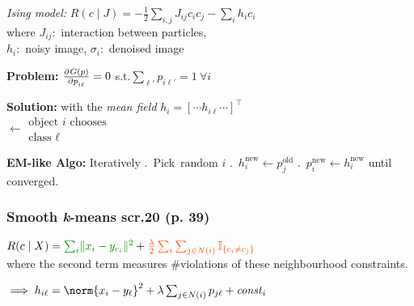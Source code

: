 \emph{Ising model:}\enskip
$R(c\mid J) = -\frac12 \sum_{i,j} J_{ij} c_i c_j - \sum_i h_i c_i$
\\
where $J_{ij}$:\, interaction between particles,\\\phantom{where}
$h_i$:\, noisy image,\enskip
$\sigma_i$:\, denoised image

\textbf{Problem:} \quad $\pderiv{G(p)}{p_{i\ell}} = 0$ \enspace s.t.\enspace $\sum_{\ell'} p_{i\ell'} = 1 \: \forall i$

\textbf{Solution:}\quad
with the \textit{mean field} $h_i = [\cdots h_{i\ell} \cdots]^\top$
\\
 $\leftarrow \substack{\text{object }i\text{ chooses}\\\text{class } \ell}$
\\

\textbf{EM-like Algo:}\enspace
Iteratively .~Pick~random $i$ .~$h_i^{\mathrm{new}} {\leftarrow} p_j^{\mathrm{old}}$ .~$p_i^{\mathrm{new}} {\leftarrow} h_i^{\mathrm{new}}$ \enspace
until converged.

\subsubsection{Smooth \textit{\rmfamily k}-means
\qquad\normalfont\sffamily\color{gray}scr.20 (p. 39)}

$R(c\mid X) =
{\color{Green} \sum_i \lVert x_i - y_{c_i} \rVert^2}
+
{\color{OrangeRed} \frac\lambda2 \sum_i \sum_{j\in N(i)} \mathbb I_{\{c_i \neq c_j\}}}$
\\
where the second term measures {\color{OrangeRed} \#violations} of these neighbourhood constraints.

$\implies h_{i\ell} = \norm{x_i - y_\ell}^2 + \lambda \sum_{j\in N(i)} p_{j\ell} + \mathit{const}_i$


